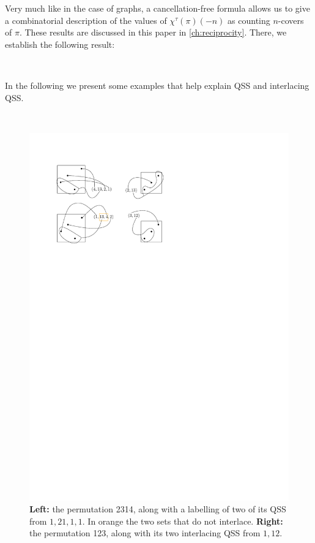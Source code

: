 \documentclass[12pt, reqno]{amsart}
\theoremstyle{definition}
\begin{document}
Very much like in the case of graphs, a cancellation-free formula allows us to give a combinatorial description of the values of $\chi^{\tau}(\pi)(-n)$ as counting $n$-covers of $\pi$.
These results are discussed in this paper in \cref{ch:reciprocity}.
There, we establish the following result:



\

In the following we present some examples that help explain QSS and interlacing QSS.

\


\begin{figure}[h]
    \centering
    \includegraphics{../images/interlacing_25314_square.pdf}
    \caption{\textbf{Left:} the permutation 2314, along with a labelling of two of its QSS from $1, 21, 1, 1$. In orange the two sets that do not interlace. \textbf{Right:} the permutation 123, along with its two interlacing QSS from $1, 12$.\label{fig:interlacingQSSsmpl}}
\end{figure}
\end{document}
